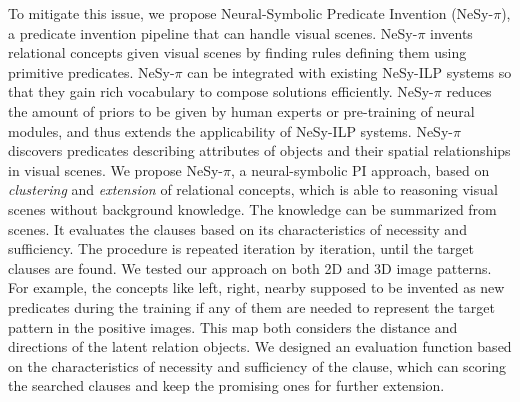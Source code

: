 \documentclass[
]{ceurart}
\begin{document}
	To mitigate this issue, we propose Neural-Symbolic Predicate Invention (NeSy-$\pi$), a predicate invention pipeline that can handle visual scenes. NeSy-$\pi$ invents relational concepts given visual scenes by finding rules defining them using primitive predicates.
	NeSy-$\pi$ can be integrated with existing NeSy-ILP systems so that they gain rich vocabulary to compose solutions efficiently.
	NeSy-$\pi$ reduces the amount of priors to be given by human experts or pre-training of neural modules, and thus extends the applicability of NeSy-ILP systems.
	NeSy-$\pi$ discovers predicates describing attributes of objects and their spatial relationships in visual scenes.
	We propose NeSy-$\pi$, a neural-symbolic PI approach, based on \textit{clustering} and \textit{extension} of relational concepts, which is able to reasoning visual scenes without background knowledge. The knowledge can be summarized from scenes. It evaluates the clauses based on its characteristics of necessity and sufficiency. The procedure is repeated iteration by iteration, until the target clauses are found. We tested our approach on both 2D and 3D image patterns.
	For example, the concepts like left, right, nearby supposed to be invented as new predicates during the training if any of them are needed to represent the target pattern in the positive images.  This map both considers the distance and directions of the latent relation objects. 
	We designed an evaluation function based on the characteristics of necessity and sufficiency of the clause, which can scoring the searched clauses and keep the promising ones for further extension.
	
\end{document}
